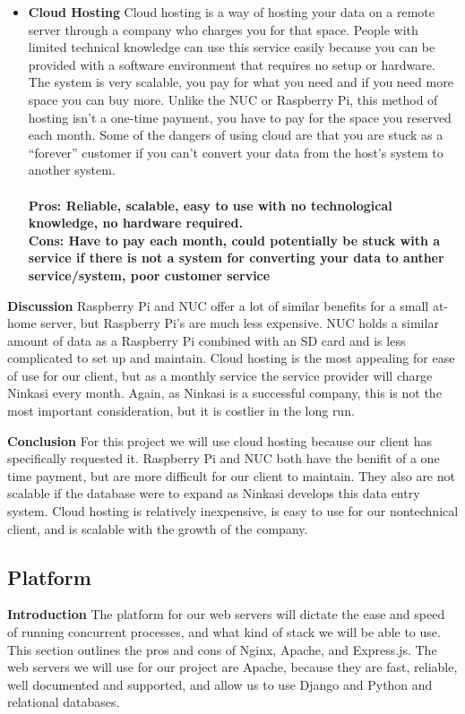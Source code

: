 \documentclass[draftclsnofoot,onecolumn,letterpaper,10pt]{IEEEtran}
\begin{document}
\begin{itemize}
				\item{\textbf{Cloud Hosting}}
					Cloud hosting is a way of hosting your data on a remote server through a company who charges you for that space.
					People with limited technical knowledge can use this service easily because you can be provided with a software environment that requires no setup or hardware\cite{InterRoute}.
					The system is very scalable, you pay for what you need and if you need more space you can buy more\cite{InterRoute}.
					Unlike the NUC or Raspberry Pi, this method of hosting isn't a one-time payment, you have to pay for the space you reserved each month\cite{TheBalance}.
					Some of the dangers of using cloud are that you are stuck as a “forever” customer if you can't convert your data from the host's system to another system\cite{TheBalance}.
					\\ \\
					\textbf{Pros: Reliable, scalable, easy to use with no technological knowledge, no hardware required.}
					\\
					\textbf{Cons: Have to pay each month, could potentially be stuck with a service if there is not a system for converting your data to anther service/system, poor customer service}

			\end{itemize}


			\textbf{Discussion}
				Raspberry Pi and NUC offer a lot of similar benefits for a small at-home server, but Raspberry Pi’s are much less expensive.
				NUC holds a similar amount of data as a Raspberry Pi combined with an SD card and is less complicated to set up and maintain.
				Cloud hosting is the most appealing for ease of use for our client, but as a monthly service the service provider will charge Ninkasi every month.
				Again, as Ninkasi is a successful company, this is not the most important consideration, but it is costlier in the long run.

			\textbf{Conclusion}
			For this project we will use cloud hosting because our client has specifically requested it.
			Raspberry Pi and NUC both have the benifit of a one time payment, but are more difficult for our client to maintain.
			They also are not scalable if the database were to expand as Ninkasi develops this data entry system.
			Cloud hosting is relatively inexpensive, is easy to use for our nontechnical client, and is scalable with the growth of the company.



	\subsection{Platform}
	\textbf{Introduction}
	The platform for our web servers will dictate the ease and speed of running concurrent processes, and what kind of stack we will be able to use.
	This section outlines the pros and cons of Nginx, Apache, and Express.js.
	The web servers we will use for our project are Apache, because they are fast, reliable, well documented and supported, and allow us to use Django and Python and relational databases.
\end{document}
